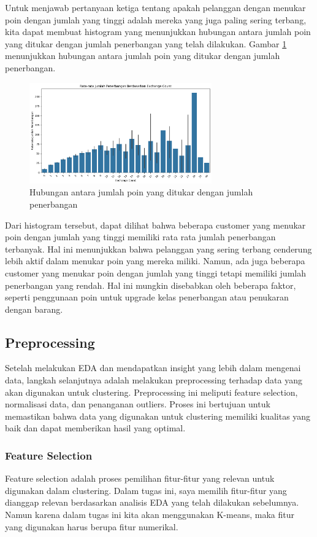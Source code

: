 Untuk menjawab pertanyaan ketiga tentang apakah pelanggan dengan menukar poin dengan jumlah yang tinggi adalah mereka yang juga paling sering terbang, kita dapat membuat histogram yang menunjukkan hubungan antara jumlah poin yang ditukar dengan jumlah penerbangan yang telah dilakukan. Gambar \ref{fig:points_flight_count} menunjukkan hubungan antara jumlah poin yang ditukar dengan jumlah penerbangan.

\begin{figure}[H]
    \centering
    \includegraphics[width=0.7\textwidth]{gambar/exchange.png}
    \caption{Hubungan antara jumlah poin yang ditukar dengan jumlah penerbangan}
    \label{fig:points_flight_count}
\end{figure}

Dari histogram tersebut, dapat dilihat bahwa beberapa customer yang menukar poin dengan jumlah yang tinggi memiliki rata rata jumlah penerbangan terbanyak. Hal ini menunjukkan bahwa pelanggan yang sering terbang cenderung lebih aktif dalam menukar poin yang mereka miliki. Namun, ada juga beberapa customer yang menukar poin dengan jumlah yang tinggi tetapi memiliki jumlah penerbangan yang rendah. Hal ini mungkin disebabkan oleh beberapa faktor, seperti penggunaan poin untuk upgrade kelas penerbangan atau penukaran dengan barang.

\subsection{Preprocessing}
Setelah melakukan EDA dan mendapatkan insight yang lebih dalam mengenai data, langkah selanjutnya adalah melakukan preprocessing terhadap data yang akan digunakan untuk clustering. Preprocessing ini meliputi feature selection, normalisasi data, dan penanganan outliers. Proses ini bertujuan untuk memastikan bahwa data yang digunakan untuk clustering memiliki kualitas yang baik dan dapat memberikan hasil yang optimal.

\subsubsection{Feature Selection}
Feature selection adalah proses pemilihan fitur-fitur yang relevan untuk digunakan dalam clustering. Dalam tugas ini, saya memilih fitur-fitur yang dianggap relevan berdasarkan analisis EDA yang telah dilakukan sebelumnya. Namun karena dalam tugas ini kita akan menggunakan K-means, maka fitur yang digunakan harus berupa fitur numerikal.

